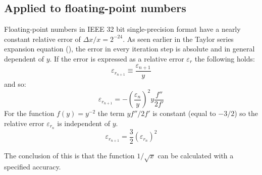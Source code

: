 \subsection{Applied to floating-point numbers}
Floating-point numbers in IEEE 32 bit single-precision format have a nearly
constant relative error of $\Delta x / x = 2^{-24}$. As seen earlier in the
Taylor series expansion equation (), the error in every
iteration step is absolute and in general dependent of $y$. If the error is
expressed as a relative error $\varepsilon_{r}$ the following holds:
\begin{equation}
\varepsilon _{{r}_{n+1}} \equiv \frac{\varepsilon_{n+1}}{y}
\end{equation}
and so:
\begin{equation}
\varepsilon _{{r}_{n+1}} =
- ( \frac{\varepsilon _{n}}{y} )^{2} y \frac{ f''}{2f'}
\end{equation}
For the function $f(y) = y^{-2}$ the term $y f''/2f'$ is constant (equal
to $-3/2$) so the relative error $\varepsilon _{r_{n}}$ is independent of $y$.
\begin{equation}
\varepsilon _{{r}_{n+1}} =
\frac{3}{2} (\varepsilon_{r_{n}})^{2}
\label{eqn:epsr}
\end{equation}

The conclusion of this is that the function $1/\sqrt{x}$ can be
calculated with a specified accuracy.

